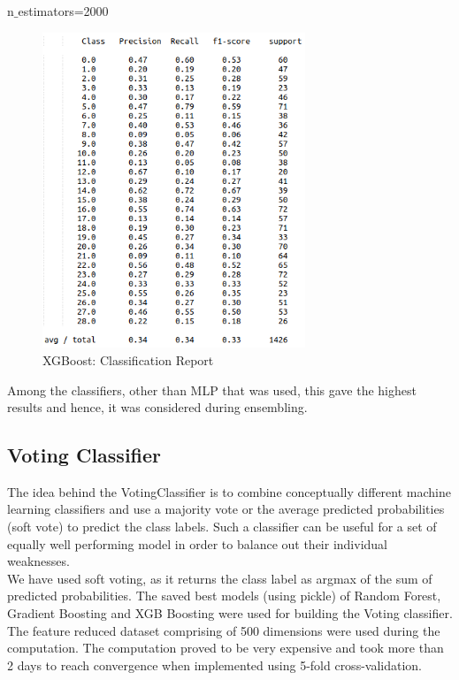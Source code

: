 \documentclass[12pt]{report}
\begin{document}
\newpage
n$\_$estimators=2000
\begin{figure}[H]
  \centering
  \includegraphics[width=0.7\textwidth]{Images/xgb3.png}
  \caption{XGBoost: Classification Report}
\end{figure}

Among the classifiers, other than MLP that was used, this gave the highest results and hence, it was considered during ensembling.

\newpage
\subsection{Voting Classifier}
The idea behind the VotingClassifier is to combine conceptually different machine learning classifiers and use a majority vote or the average predicted probabilities (soft vote) to predict the class labels. Such a classifier can be useful for a set of equally well performing model in order to balance out their individual weaknesses.\\

We have used soft voting, as it returns the class label as argmax of the sum of predicted probabilities. The saved best models (using pickle) of Random Forest, Gradient Boosting and XGB Boosting were used for building the Voting classifier. The feature reduced dataset comprising of 500 dimensions were used during the computation. The computation proved to be very expensive and took more than 2 days to reach convergence when implemented using 5-fold cross-validation.\\
\end{document}
